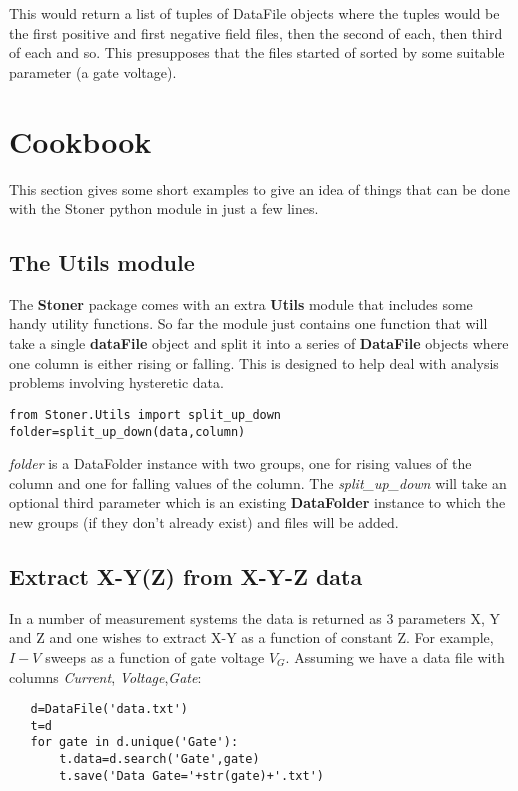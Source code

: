 \documentclass[a4paper,11pt]{scrartcl}
\begin{document}
This would return a list of tuples of DataFile objects where the tuples would be the first positive and first negative field files, then the second of each, then third of each and so. This presupposes that the files started of sorted by some suitable parameter (\eg a gate voltage).



\section{Cookbook}

This section gives some short examples to give an idea of things that can be
done with the Stoner python module in just a few lines.

\subsection{The Utils module}

The \textbf{Stoner} package comes with an extra \textbf{Utils} module that includes some handy utility functions.
So far the module just contains one function that will take a single \textbf{dataFile} object and split it
into a series of \textbf{DataFile} objects where one column is either rising or falling. This is designed to help
deal with analysis problems involving hysteretic data.
\begin{lstlisting}
from Stoner.Utils import split_up_down
folder=split_up_down(data,column)
\end{lstlisting}
\textit{folder} is a DataFolder instance with two groups, one for rising values of the column and one for falling values of the column. The \textit{split\_up\_down} will take an optional third parameter which is an existing \textbf{DataFolder} instance to which the new groups (if they don't already exist) and files will be added.  

\subsection{Extract X-Y(Z) from X-Y-Z data}

In a number of measurement systems the data is returned as 3 parameters X, Y and
Z and one wishes to extract X-Y as a function of constant Z. For example, $I-V$
sweeps as a function of gate voltage $V_G$. Assuming we have a data file with
columns \textit{Current}, \textit{Voltage},\textit{Gate}:

\begin{lstlisting}
   d=DataFile('data.txt')
   t=d
   for gate in d.unique('Gate'):
       t.data=d.search('Gate',gate)
       t.save('Data Gate='+str(gate)+'.txt')
\end{lstlisting}
\end{document}
